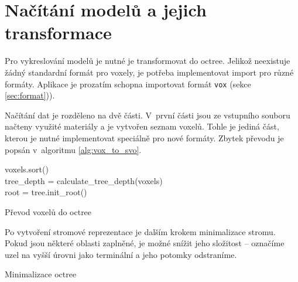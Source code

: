 \section{Načítání modelů a jejich transformace} \label{sec:voxel_conversion}
Pro vykreslování modelů je nutné je transformovat do octree. Jelikož neexistuje žádný standardní formát pro voxely, je potřeba implementovat import pro různé formáty. Aplikace je prozatím schopna importovat formát \texttt{vox} (sekce \ref{sec:format})).

Načítání dat je rozděleno na dvě části. V~první části jsou ze vstupního souboru načteny využité materiály a je vytvořen seznam voxelů. Tohle je jediná část, kterou je nutné implementovat speciálně pro nové formáty. Zbytek převodu je popsán v~algoritmu \ref{alg:vox_to_svo}.


\begin{center}
	\begin{czechalgorithm}[H] \label{alg:vox_to_svo}
		voxels.sort() \\
		tree\_depth = calculate\_tree\_depth(voxels)\\
		root = tree.init\_root()\\
		\caption{Převod voxelů do octree}
	\end{czechalgorithm}
\end{center}

Po vytvoření stromové reprezentace je dalším krokem minimalizace stromu. Pokud jsou některé oblasti zaplněné, je možné snížit jeho složitost -- označíme uzel na vyšší úrovni jako terminální a jeho potomky odstraníme.

\begin{center}
	\begin{czechalgorithm}[H] \label{alg:minimize_svo}


		\caption{Minimalizace octree}
	\end{czechalgorithm}
\end{center}

